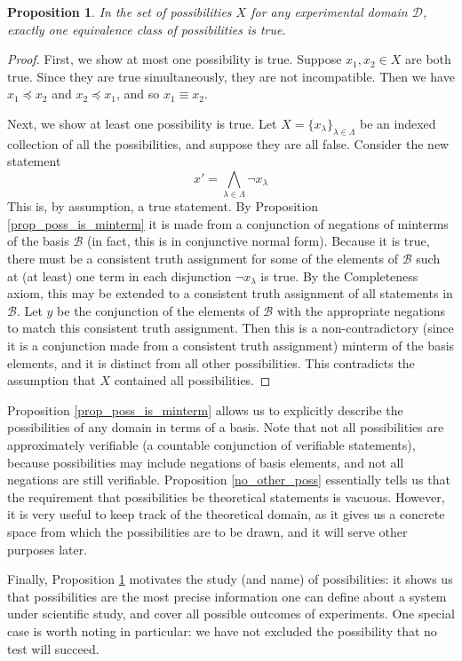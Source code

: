\documentclass[psamsfonts]{amsart}
\newtheorem{prop}[thm]{Proposition}
\theoremstyle{definition}
\theoremstyle{remark}
\numberwithin{equation}{section}
\def\narrower{\preccurlyeq}
\def\bigAND{\bigwedge}
\def\NOT{\neg}
\newcommand{\edomain}[1][D] {\mathcal{#1}}
\newcommand{\basis}[1][B] {\mathcal{#1}} %
\begin{document}
\begin{prop}\label{exactly_one_poss}
In the set of possibilities $X$ for any experimental domain $\edomain$, exactly one equivalence class of possibilities is true. 
\end{prop}
\begin{proof}
First, we show at most one possibility is true. Suppose $x_1,x_2\in X$ are both true. Since they are true simultaneously, they are not incompatible. Then we have $x_1\narrower x_2$ and $x_2\narrower x_1$, and so $x_1\equiv x_2$. 

Next, we show at least one possibility is true. Let $X=\{x_{\lambda}\}_{\lambda\in\Lambda}$ be an indexed collection of all the possibilities, and suppose they are all false. Consider the new statement
$$
x' = \bigAND_{\lambda\in\Lambda}\NOT x_{\lambda}
$$
This is, by assumption, a true statement. By Proposition \ref{prop_poss_is_minterm} it is made from a conjunction of negations of minterms of the basis $\basis$ (in fact, this is in conjunctive normal form). Because it is true, there must be a consistent truth assignment for some of the elements of $\basis$ such at (at least) one term in each disjunction $\NOT x_{\lambda}$ is true. By the Completeness axiom, this may be extended to a consistent truth assignment of all statements in $\basis$. Let $y$ be the conjunction of the elements of $\basis$ with the appropriate negations to match this consistent truth assignment. Then this is a non-contradictory (since it is a conjunction made from a consistent truth assignment) minterm of the basis elements, and it is distinct from all other possibilities. This contradicts the assumption that $X$ contained all possibilities.
\end{proof}


Proposition \ref{prop_poss_is_minterm} allows us to explicitly describe the possibilities of any domain in terms of a basis. Note that not all possibilities are approximately verifiable (a countable conjunction of verifiable statements), because possibilities may include negations of basis elements, and not all negations are still verifiable. Proposition \ref{no_other_poss} essentially tells us that the requirement that possibilities be theoretical statements is vacuous. However, it is very useful to keep track of the theoretical domain, as it gives us a concrete space from which the possibilities are to be drawn, and it will serve other purposes later. 

Finally, Proposition \ref{exactly_one_poss} motivates the study (and name) of possibilities: it shows us that possibilities are the most precise information one can define about a system under scientific study, and cover all possible outcomes of experiments. One special case is worth noting in particular: we have not excluded the possibility that no test will succeed.
\end{document}
